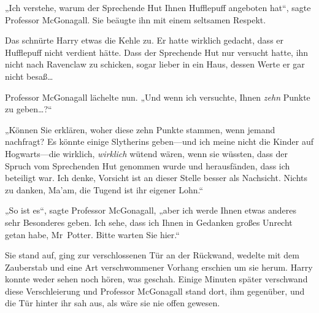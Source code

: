 „Ich verstehe, warum der Sprechende Hut Ihnen Hufflepuff angeboten hat“, sagte Professor McGonagall. Sie beäugte ihn mit einem seltsamen Respekt.

Das schnürte Harry etwas die Kehle zu. Er hatte wirklich gedacht, dass er Hufflepuff nicht verdient hätte. Dass der Sprechende Hut nur versucht hatte, ihn nicht nach Ravenclaw zu schicken, sogar lieber in ein Haus, dessen Werte er gar nicht besaß…

Professor McGonagall lächelte nun. „Und wenn ich versuchte, Ihnen \emph{zehn} Punkte zu geben…?“

„Können Sie erklären, woher diese zehn Punkte stammen, wenn jemand nachfragt? Es könnte einige Slytherins geben—und ich meine nicht die Kinder auf Hogwarts—die wirklich, \emph{wirklich} wütend wären, wenn sie wüssten, dass der Spruch vom Sprechenden Hut genommen wurde und herausfänden, dass ich beteiligt war. Ich denke, Vorsicht ist an dieser Stelle besser als Nachsicht. Nichts zu danken, Ma’am, die Tugend ist ihr eigener Lohn.“

„So ist es“, sagte Professor McGonagall, „aber ich werde Ihnen etwas anderes sehr Besonderes geben. Ich sehe, dass ich Ihnen in Gedanken großes Unrecht getan habe, Mr~Potter. Bitte warten Sie hier.“

Sie stand auf, ging zur verschlossenen Tür an der Rückwand, wedelte mit dem Zauberstab und eine Art verschwommener Vorhang erschien um sie herum. Harry konnte weder sehen noch hören, was geschah. Einige Minuten später verschwand diese Verschleierung und Professor McGonagall stand dort, ihm gegenüber, und die Tür hinter ihr sah aus, als wäre sie nie offen gewesen.

